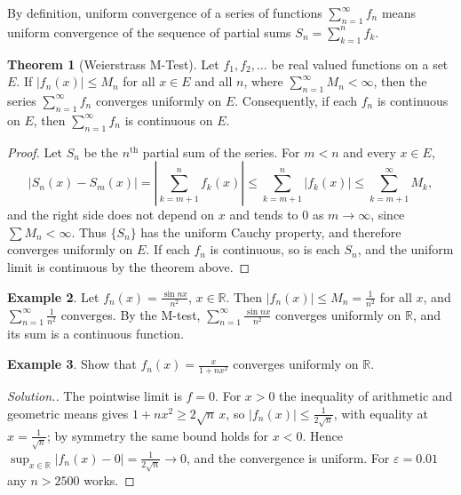 \documentclass[11pt,a4paper]{article}
\numberwithin{equation}{section}
\theoremstyle{definition}
\newtheorem{thm}{Theorem}[subsection]
\newtheorem{exa}[thm]{Example}
\newenvironment{solution}
  {\renewcommand{\qedsymbol}{}\begin{proof}[\textit{Solution}.]}
  {\end{proof}}
\begin{document}
By definition, uniform convergence of a series of functions $\sum^{\infty}_{n = 1} f_n$ means uniform convergence of the sequence of partial sums $S_n = \sum^{n}_{k = 1} f_k$.


\begin{thm}[Weierstrass M-Test]
Let $f_1, f_2, \dots$ be real valued functions on a set $E$. If $|f_n (x)| \leq M_n$ for all $x\in E$ and all $n$, where $\sum^{\infty}_{n = 1} M_n < \infty$, then the series $\sum^{\infty}_{n=1} f_n$ converges uniformly on $E$. Consequently, if each $f_n$ is continuous on $E$, then $\sum^{\infty}_{n = 1} f_n$ is continuous on $E$.
\end{thm}

\begin{proof}
Let $S_n$ be the $n^{\text{th}}$ partial sum of the series. For $m< n$ and every $x\in E$,
$$|S_n(x) - S_m(x)| = \left|\sum^n_{k = m + 1} f_k(x)\right| \leq \sum^n_{k = m + 1} |f_k(x)| \leq \sum^{\infty}_{k=m + 1} M_k ,$$
and the right side does not depend on $x$ and tends to $0$ as $m\longrightarrow \infty$, since $\sum M_n < \infty$. Thus $\{S_n\}$ has the uniform Cauchy property, and therefore converges uniformly on $E$. If each $f_n$ is continuous, so is each $S_n$, and the uniform limit is continuous by the theorem above.
\end{proof}


\begin{exa}
Let $f_n(x) = \frac{\sin nx}{n^2}$, $x\in \mathbb{R}$. Then $|f_n(x)|\leq M_n = \frac{1}{n^2}$ for all $x$, and $\sum^{\infty}_{n = 1} \frac{1}{n^2}$ converges. By the M-test, $\sum^{\infty}_{n=1} \frac{\sin nx}{n^2}$ converges uniformly on $\mathbb{R}$, and its sum is a continuous function.
\end{exa}

\begin{exa}
Show that $f_n(x) = \frac{x}{1+nx^2}$ converges uniformly on $\mathbb{R}$.
\end{exa}

\begin{solution}
The pointwise limit is $f = 0$. For $x>0$ the inequality of arithmetic and geometric means gives $1 + nx^2\geq 2\sqrt{n}\,x$, so $|f_n(x)|\leq\frac{1}{2\sqrt{n}}$, with equality at $x = \frac{1}{\sqrt{n}}$; by symmetry the same bound holds for $x<0$. Hence $\sup_{x\in\mathbb{R}}|f_n(x) - 0| = \frac{1}{2\sqrt{n}}\longrightarrow0$, and the convergence is uniform. For $\varepsilon = 0.01$ any $n>2500$ works.
\end{solution}
\end{document}

